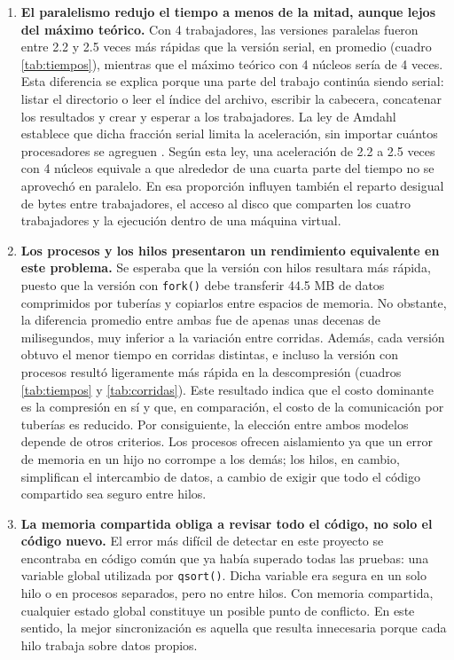 \documentclass{report}
\begin{document}
\begin{enumerate}
    \item \textbf{El paralelismo redujo el tiempo a menos de la mitad, aunque lejos del máximo teórico.} Con 4 trabajadores, las versiones paralelas fueron entre 2.2 y 2.5 veces más rápidas que la versión serial, en promedio (cuadro \ref{tab:tiempos}), mientras que el máximo teórico con 4 núcleos sería de 4 veces. Esta diferencia se explica porque una parte del trabajo continúa siendo serial: listar el directorio o leer el índice del archivo, escribir la cabecera, concatenar los resultados y crear y esperar a los trabajadores. La ley de Amdahl establece que dicha fracción serial limita la aceleración, sin importar cuántos procesadores se agreguen \cite{amdahl67}. Según esta ley, una aceleración de 2.2 a 2.5 veces con 4 núcleos equivale a que alrededor de una cuarta parte del tiempo no se aprovechó en paralelo. En esa proporción influyen también el reparto desigual de bytes entre trabajadores, el acceso al disco que comparten los cuatro trabajadores y la ejecución dentro de una máquina virtual.

    \item \textbf{Los procesos y los hilos presentaron un rendimiento equivalente en este problema.} Se esperaba que la versión con hilos resultara más rápida, puesto que la versión con \texttt{fork()} debe transferir 44.5 MB de datos comprimidos por tuberías y copiarlos entre espacios de memoria. No obstante, la diferencia promedio entre ambas fue de apenas unas decenas de milisegundos, muy inferior a la variación entre corridas. Además, cada versión obtuvo el menor tiempo en corridas distintas, e incluso la versión con procesos resultó ligeramente más rápida en la descompresión (cuadros \ref{tab:tiempos} y \ref{tab:corridas}). Este resultado indica que el costo dominante es la compresión en sí y que, en comparación, el costo de la comunicación por tuberías es reducido. Por consiguiente, la elección entre ambos modelos depende de otros criterios. Los procesos ofrecen aislamiento ya que un error de memoria en un hijo no corrompe a los demás; los hilos, en cambio, simplifican el intercambio de datos, a cambio de exigir que todo el código compartido sea seguro entre hilos.

    \item \textbf{La memoria compartida obliga a revisar todo el código, no solo el código nuevo.} El error más difícil de detectar en este proyecto se encontraba en código común que ya había superado todas las pruebas: una variable global utilizada por \texttt{qsort()}. Dicha variable era segura en un solo hilo o en procesos separados, pero no entre hilos. Con memoria compartida, cualquier estado global constituye un posible punto de conflicto. En este sentido, la mejor sincronización es aquella que resulta innecesaria porque cada hilo trabaja sobre datos propios.


\end{enumerate}
\end{document}
